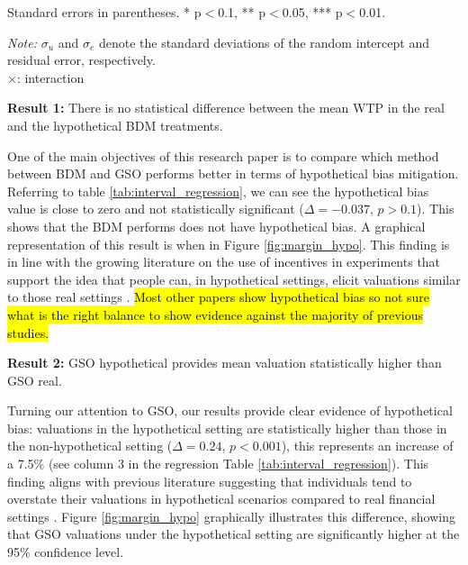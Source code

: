 \documentclass[12pt]{article}
\begin{document}
\begin{table}[H]
\begin{tablenotes}
            \footnotesize
            \item Standard errors in parentheses. * p$<$0.1, ** p$<$0.05, *** p$<$0.01.
            \item \textit{Note:} $\sigma_u$ and $\sigma_e$ denote the standard deviations of the random intercept and residual error, respectively.\\
            $\times$: interaction\\
        \end{tablenotes}
            \end{table}



\textbf{Result 1:} There is no statistical difference between  the mean WTP in the real and the hypothetical BDM treatments. 

One of the main objectives of this research paper is to compare which method between BDM and GSO performs better in terms of hypothetical bias mitigation. Referring to table \ref{tab:interval_regression}, we can see the hypothetical bias value is close to zero and not statistically significant (\(\Delta = -0.037\), \(p > 0.1\)). This shows that the BDM performs does not have hypothetical bias. A graphical representation of this result is when in Figure \ref{fig:margin_hypo}.  This finding is in line with the growing literature on the use of incentives in experiments that support the idea that people can, in hypothetical settings, elicit valuations similar to those real settings \citep{branas-garza_paid_2023, drichoutis_incentives_2025}. \hl{Most other papers show hypothetical bias so not sure what is the right balance to show evidence against the majority of previous studies.}
\vspace{0.5cm}

\textbf{Result 2:} GSO hypothetical provides mean valuation statistically higher than GSO real. 

Turning our attention to GSO, our results provide clear evidence of hypothetical bias: valuations in the hypothetical setting are statistically higher than those in the non-hypothetical setting (\(\Delta = 0.24\), \(p < 0.001\)), this represents  an increase of a 7.5\% (see column 3 in the regression Table \ref{tab:interval_regression}). This finding aligns with previous literature suggesting that individuals tend to overstate their valuations in hypothetical scenarios compared to real financial settings \citep{penn2018understanding, fang_use_2021}. Figure \ref{fig:margin_hypo} graphically illustrates this difference, showing that GSO valuations under the hypothetical setting are significantly higher at the 95\% confidence level. 
\end{document}

